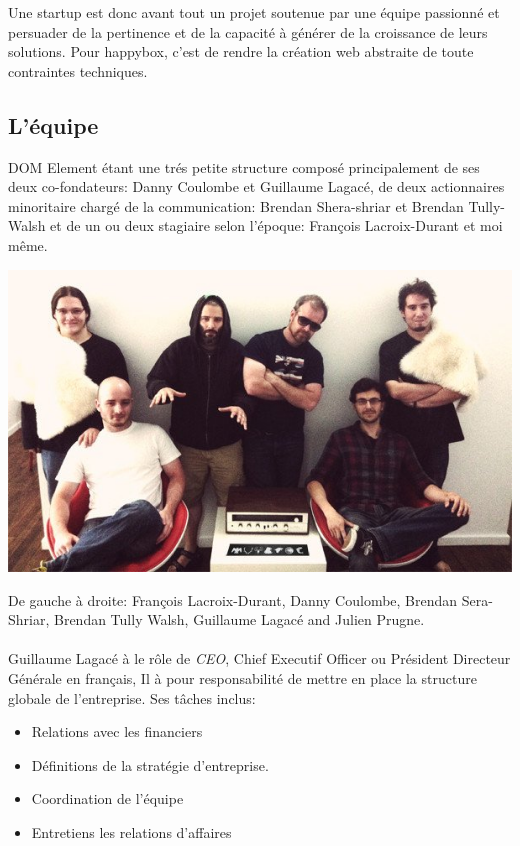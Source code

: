 \documentclass[11pt, a4paper ]{article}
\begin{document}
Une startup est donc avant tout un projet soutenue par une équipe passionné et persuader de la pertinence et de la capacité à générer de la croissance de leurs solutions. Pour happybox, c'est de rendre la création web abstraite de toute contraintes techniques.

		\subsection{L'équipe} %
DOM Element étant une trés petite structure composé principalement de ses deux co-fondateurs: Danny Coulombe et Guillaume Lagacé, de deux actionnaires minoritaire chargé de la communication: Brendan Shera-shriar et Brendan Tully-Walsh et de un ou deux stagiaire selon l'époque: François Lacroix-Durant et moi même.

\begin{center}
	\includegraphics[width=\textwidth]{images/team/team.jpg}

	 De gauche à droite: François Lacroix-Durant, Danny Coulombe, Brendan Sera-Shriar, Brendan Tully Walsh, Guillaume Lagacé and Julien Prugne.
\end{center}

\paragraph{}
	Guillaume Lagacé à le rôle de \emph{CEO}, Chief Executif Officer ou Président Directeur Générale en français, Il à pour responsabilité de mettre en place la structure globale de l'entreprise.
	Ses tâches inclus:

		\begin{itemize}
			\item
				Relations avec les financiers
			\item
				Définitions de la stratégie d'entreprise.
			\item
				Coordination de l'équipe
			\item
				Entretiens les relations d'affaires
		\end{itemize}
\end{document}
